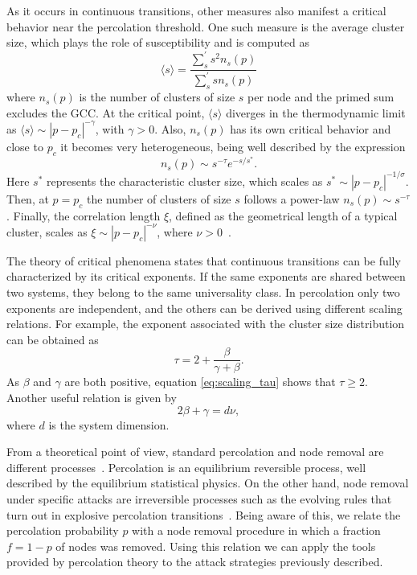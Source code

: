\documentclass{article}
\begin{document}
As it occurs in continuous transitions, other measures also manifest a critical behavior near the percolation threshold. One such measure is the average cluster size, which plays the role of susceptibility and is computed as 
%
\begin{equation}
    \langle s \rangle = \frac{\sum_{s}^{'} s^2 n_s(p)}{\sum_s^{'} s n_s(p)} 
\end{equation}
%
where $n_s(p)$ is the number of clusters of size $s$ per node and the primed sum excludes the GCC. At the critical point, $\langle s \rangle$ diverges in the thermodynamic limit as $\langle s \rangle  \sim |p-p_c|^{-\gamma}$, with $\gamma>0$. Also, $n_s(p)$ has its own critical behavior and close to $p_c$ it becomes very heterogeneous, being well described by the expression
%
\begin{equation} \label{eq:ns}
n_s(p) \sim s^{-\tau} e^{-s/s^*}.
\end{equation}
%
Here $s^*$ represents the characteristic cluster size, which scales as $s^* \sim |p-p_c|^{-1/\sigma}$. Then, at $p=p_c$ the number of clusters of size $s$ follows a power-law $n_s(p) \sim s^{-\tau}$. Finally, the correlation length $\xi$, defined as the geometrical length of a typical cluster, scales as $\xi \sim |p-p_c|^{-\nu}$, where $\nu>0$~\cite{StaufferBook}.


The theory of critical phenomena states that continuous transitions can be fully characterized by its critical exponents. If the same exponents are shared between two systems, they belong to the same universality class. In percolation only two exponents are independent, and the others can be derived using different scaling relations. For example, the exponent associated with the cluster size distribution can be obtained as \cite{StaufferBook}
%
\begin{equation}\label{eq:scaling_tau}
    \tau = 2 + \dfrac{\beta}{\gamma + \beta}.
\end{equation}
%
As $\beta$ and $\gamma$ are both positive, equation \ref{eq:scaling_tau} shows that $\tau \geq 2$. Another useful relation is given by \cite{BrankovBook, Fortunato2011ExplosiveGraphs}
%
\begin{equation} \label{eq:gamma_beta_nu}
    2\beta + \gamma = d\nu,
\end{equation}
%
where $d$ is the system dimension.

From a theoretical point of view, standard percolation and node removal are different processes~\cite{Cohen2000BreakdownAttack}. Percolation is an equilibrium reversible process, well described by the equilibrium statistical physics. 
On the other hand, node removal under specific attacks are irreversible  processes such as the evolving rules that turn out in explosive percolation transitions~\cite{DaCosta2014SolutionExponents}.
Being aware of this, we relate the percolation probability $p$ with a node removal procedure in which a fraction $f=1-p$ of nodes was removed. Using this relation we can apply the tools provided by percolation theory to the attack strategies previously described.
\end{document}
